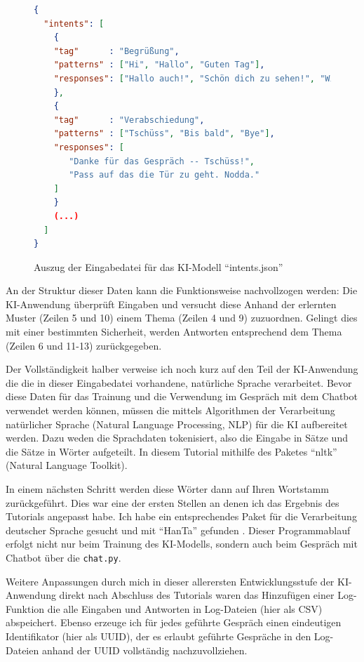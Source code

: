 \documentclass[12pt,oneside,titlepage,listof=totoc,bibliography=totoc]{scrartcl}
\newcommand{\code}[1]{\colorbox{code-gray}{\texttt{#1}}}
\begin{document}
\begin{figure}[H] \caption{Auszug der Eingabedatei für das KI-Modell \enquote{intents.json}}
\label{fig:code-intents.json} \begin{lstlisting}[language=json]
{
  "intents": [
    {
    "tag"      : "Begrüßung",
    "patterns" : ["Hi", "Hallo", "Guten Tag"],
    "responses": ["Hallo auch!", "Schön dich zu sehen!", "Willkommen!"]
    },
    {
    "tag"      : "Verabschiedung",
    "patterns" : ["Tschüss", "Bis bald", "Bye"],
    "responses": [
       "Danke für das Gespräch -- Tschüss!",
       "Pass auf das die Tür zu geht. Nodda."
    ]
    }
    (...)
  ]
}
\end{lstlisting} \end{figure}

An der Struktur dieser Daten kann die Funktionsweise nachvollzogen werden: Die KI-Anwendung überprüft Eingaben und versucht diese Anhand der erlernten Muster (Zeilen 5 und 10) einem Thema (Zeilen 4 und 9) zuzuordnen. Gelingt dies mit einer bestimmten Sicherheit, werden Antworten entsprechend dem Thema (Zeilen 6 und 11-13) zurückgegeben.

Der Vollständigkeit halber verweise ich noch kurz auf den Teil der KI-Anwendung die die in dieser Eingabedatei vorhandene, natürliche Sprache verarbeitet. Bevor diese Daten für das Trainung und die Verwendung im Gespräch mit dem Chatbot verwendet werden können, müssen die mittels Algorithmen der Verarbeitung natürlicher Sprache (Natural Language Processing, NLP) für die KI aufbereitet werden. Dazu weden die Sprachdaten tokenisiert, also die Eingabe in Sätze und die Sätze in Wörter aufgeteilt. In diesem Tutorial mithilfe des Paketes \enquote{nltk} (Natural Language Toolkit).

In einem nächsten Schritt werden diese Wörter dann auf Ihren Wortstamm zurückgeführt. Dies war eine der ersten Stellen an denen ich das Ergebnis des Tutorials angepasst habe. Ich habe ein entsprechendes Paket für die Verarbeitung deutscher Sprache gesucht und mit \enquote{HanTa} gefunden \parencite[]{57-wartena2019probabilistic}. Dieser Programmablauf erfolgt nicht nur beim Trainung des KI-Modells, sondern auch beim Gespräch mit Chatbot über die \code{chat.py}.

Weitere Anpassungen durch mich in dieser allerersten Entwicklungsstufe der KI-Anwendung direkt nach Abschluss des Tutorials waren das Hinzufügen einer Log-Funktion die alle Eingaben und Antworten in Log-Dateien (hier als CSV) abspeichert. Ebenso erzeuge ich für jedes geführte Gespräch einen eindeutigen Identifikator (hier als \ac{UUID}), der es erlaubt geführte Gespräche in den Log-Dateien anhand der \ac{UUID} vollständig nachzuvollziehen. 
\end{document}
